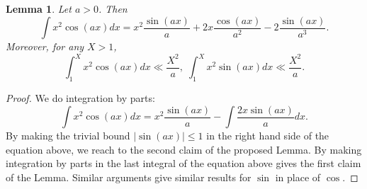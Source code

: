 \documentclass[a4paper,12pt, reqn0]{amsart}
\newtheorem{lemma}{Lemma}[section]
\theoremstyle{remark}
\begin{document}
\begin{lemma}\label{lema integrais} Let $a>0$. Then
$$\int x^2\cos(ax)dx=x^2\frac{\sin(ax)}{a}+2x\frac{\cos(ax)}{a^2}-2\frac{\sin(ax)}{a^3}.$$
Moreover, for any $X>1$,
$$\int_{1}^Xx^2\cos(ax)dx\ll \frac{X^2}{a},\;\int_{1}^Xx^2\sin(ax)dx\ll \frac{X^2}{a}.$$
\end{lemma}
\begin{proof}
We do integration by parts:
$$\int x^2\cos(ax)dx=x^2\frac{\sin(ax)}{a}-\int \frac{2x\sin(ax)}{a}dx.$$
By making the trivial bound $|\sin(ax)|\leq 1$ in the right hand side of the equation above, we reach to the second claim of the proposed Lemma. By making integration by parts in the last integral of the equation above gives the first claim of the Lemma. Similar arguments give similar results for $\sin$ in place of $\cos$. \end{proof}
\end{document}
